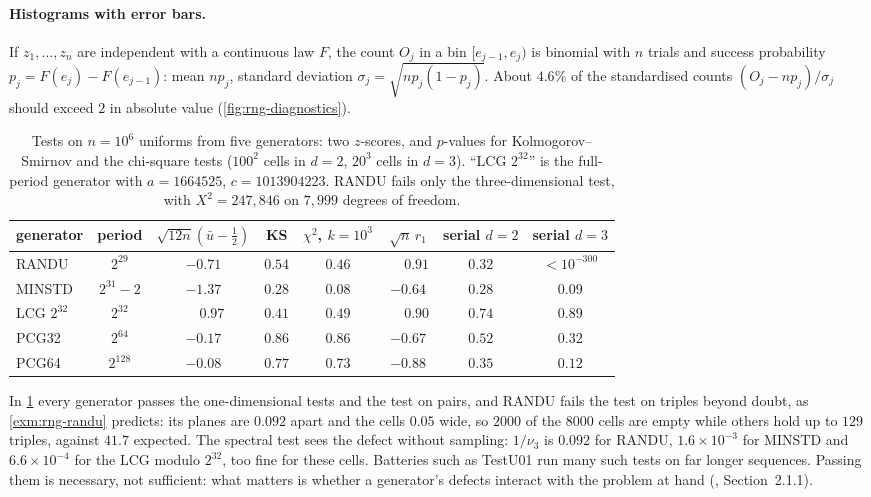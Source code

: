 \paragraph{Histograms with error bars.} If $z_1,\dots,z_n$ are independent with a continuous
law $F$, the count $O_j$ in a bin $[e_{j-1},e_j)$ is binomial with $n$ trials and success
probability $p_j=F(e_j)-F(e_{j-1})$: mean $np_j$, standard deviation
$\sigma_j=\sqrt{np_j(1-p_j)}$. About $4.6\%$ of the standardised counts
$(O_j-np_j)/\sigma_j$ should exceed $2$ in absolute value (\cref{fig:rng-diagnostics}).

\begin{table}[ht]
  \centering\small
  \begin{tabular}{@{}lccccccc@{}}
    \toprule
    generator & period & $\sqrt{12n}(\bar u-\frac12)$ & KS & $\chi^2$, $k=10^3$ & $\sqrt n\,r_1$ & serial $d=2$ & serial $d=3$\\
    \midrule
    RANDU  & $2^{29}$     & $-0.71$ & $0.54$ & $0.46$ & $\phantom{-}0.91$ & $0.32$ & $<10^{-300}$\\
    MINSTD & $2^{31}-2$   & $-1.37$ & $0.28$ & $0.08$ & $-0.64$ & $0.28$ & $0.09$\\
    LCG $2^{32}$ & $2^{32}$ & $\phantom{-}0.97$ & $0.41$ & $0.49$ & $\phantom{-}0.90$ & $0.74$ & $0.89$\\
    PCG32  & $2^{64}$     & $-0.17$ & $0.86$ & $0.86$ & $-0.67$ & $0.52$ & $0.32$\\
    PCG64  & $2^{128}$    & $-0.08$ & $0.77$ & $0.73$ & $-0.88$ & $0.35$ & $0.12$\\
    \bottomrule
  \end{tabular}
  \caption{Tests on $n=10^6$ uniforms from five generators: two $z$-scores, and $p$-values
    for Kolmogorov--Smirnov and the chi-square tests ($100^2$ cells in $d=2$, $20^3$ cells in
    $d=3$). ``LCG $2^{32}$'' is the full-period generator with $a=1664525$,
    $c=1013904223$. RANDU fails only the three-dimensional test, with $X^2=247{,}846$ on
    $7{,}999$ degrees of freedom.}
  \label{tab:rng-tests}
\end{table}

In \cref{tab:rng-tests} every generator passes the one-dimensional tests and the test on
pairs, and RANDU fails the test on triples beyond doubt, as \cref{exm:rng-randu} predicts: its
planes are $0.092$ apart and the cells $0.05$ wide, so $2000$ of the $8000$ cells are empty
while others hold up to $129$ triples, against $41.7$ expected. The spectral test sees the
defect without sampling: $1/\nu_3$ is $0.092$ for RANDU, $1.6\times10^{-3}$ for MINSTD and
$6.6\times10^{-4}$ for the LCG modulo $2^{32}$, too fine for these cells. Batteries such as
TestU01 \citep{lecuyer-simard} run many such tests on far longer sequences. Passing them is
necessary, not sufficient: what matters is whether a generator's defects interact with the
problem at hand (\textcite{glasserman-mc}, Section~2.1.1).

